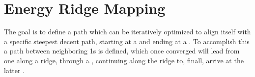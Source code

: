 \section{Energy Ridge Mapping}
The goal is to define a path which can be iteratively optimized to align itself with a specific steepest decent path,
starting at a  and ending at a .
To accomplish this a path between neighboring \sap1s is defined,
which once converged will lead from one  along a ridge,
through a ,
continuing along the ridge to, finall, arrive at the latter .

\incomplete
